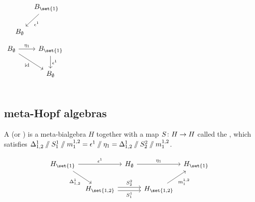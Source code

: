 \documentclass{beamer}
\begin{document}
\begin{frame}
\begin{columns}
\begin{equation*}
\begin{tikzcd}[ampersand replacement=\&,column sep=tiny]
                \&\&B_{\set{1}}
                        \dlar["\counit^{1}"] \\
                \&B_{\emptyset}
        \end{tikzcd}
        \end{equation*}
        \hline
        \begin{equation*}\label{eq:cd_unit_counit}
        \begin{tikzcd}[ampersand replacement=\&]
                B_{\emptyset}
                        \rar["\unit_{1}"]
                        \drar["\id"']
                \&B_{\set{1}}
                        \dar["\counit^{1}"] \\
                \&B_{\emptyset}
        \end{tikzcd}
        \end{equation*}
        \end{columns}
\end{frame}

\subsection{meta-Hopf algebras}

\begin{frame}
        \begin{definition}
        A  (or ) is a
        meta-bialgebra $H$ together with a map $\map {\antipode} {H} {H}$ called
        the , which satisfies
        $\Delta^{1}_{1,2}\mathbin{/\mkern-6mu/} S^1_1 \mathbin{/\mkern-6mu/} m^{1,2}_1 =
        \epsilon^{1}\mathbin{/\mkern-6mu/}\eta_{1} =
        \Delta^{1}_{1,2}\mathbin{/\mkern-6mu/} S^2_2 \mathbin{/\mkern-6mu/} m^{1,2}_1$.
        \end{definition}
        \begin{equation*}
        \begin{tikzcd}[ampersand replacement=\&,column sep=tiny]
                \label{eq:cd_antipode}
                H_{\set{1}}
                        \arrow[rr, "\counit^{1}"] \arrow[rd, "\comult^{1}_{1,2}"']
                \&\& H_{\emptyset}
                        \arrow[rr, "\unit_{1}"]
                \&\& H_{\set{1}} \\
                \& H_{\set{1,2}}
                        \arrow[rr, "\antipode^{2}_{2}", shift left]
                        \arrow[rr, "\antipode^{1}_{1}"', shift right]
                \&\& H_{\set{1,2}} \arrow[ru, "\mult^{1,2}_{1}"']
        \end{tikzcd}
        \end{equation*}
\end{frame}
\end{document}
